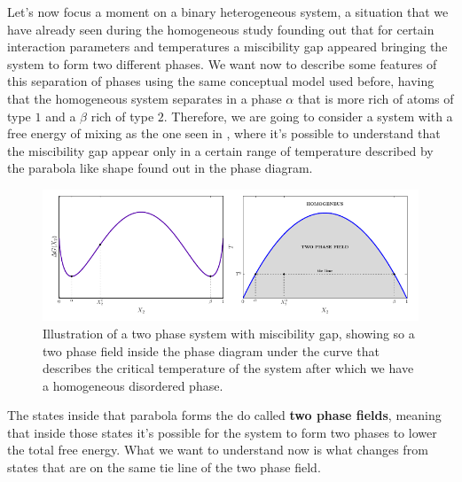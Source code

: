Let's now focus a moment on a binary heterogeneous system, a situation that we have already seen during the homogeneous study founding out that for certain interaction parameters and temperatures a miscibility gap appeared bringing the system to form two different phases. We want now to describe some features of this separation of phases using the same conceptual model used before, having that the homogeneous system separates in a phase $\alpha$ that is more rich of atoms of type $1$ and a $\beta$ rich of type $2$. Therefore, we are going to consider a system with a free energy of mixing as the one seen in , where it's possible to understand that the miscibility gap appear only in a certain range of temperature described by the parabola like shape found out in the phase diagram.
\begin{figure}[t]
    \centering
    \includegraphics[width=\textwidth]{Immagini/TwoPhase.pdf}
    \caption
    {
        Illustration of a two phase system with miscibility gap, showing so a two phase field inside the phase diagram under the curve that describes the critical temperature of the system after which we have a homogeneous disordered phase. 
    }
    \label{fig:TwoPhase}
\end{figure}
The states inside that parabola forms the do called \textbf{two phase fields}, meaning that inside those states it's possible for the system to form two phases to lower the total free energy. What we want to understand now is what changes from states that are on the same tie line of the two phase field.

